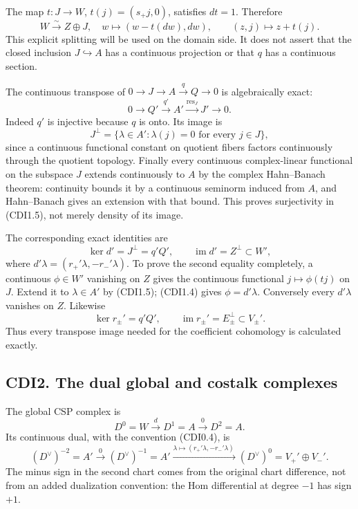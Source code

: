 The map \(t:J\to W\), \(t(j)=(s_+j,0)\), satisfies \(dt=1\). Therefore
\[
W\xrightarrow{\sim}Z\oplus J,
\quad w\longmapsto(w-t(dw),dw),
\qquad (z,j)\longmapsto z+t(j).
\tag{CDI1.4}
\] This explicit splitting will be used on the domain side. It does not
assert that the closed inclusion \(J\hookrightarrow A\) has a continuous
projection or that \(q\) has a continuous section.

The continuous transpose of \(0\to J\to A\xrightarrow q Q\to0\) is
algebraically exact: \[
0\longrightarrow Q'\xrightarrow{q'}A'
\xrightarrow{\operatorname{res}_J}J'\longrightarrow0.
\tag{CDI1.5}
\] Indeed \(q'\) is injective because \(q\) is onto. Its image is \[
J^\perp=\{\lambda\in A':\lambda(j)=0\text{ for every }j\in J\},
\tag{CDI1.6}
\] since a continuous functional constant on quotient fibers factors
continuously through the quotient topology. Finally every continuous
complex-linear functional on the subspace \(J\) extends continuously to
\(A\) by the complex Hahn--Banach theorem: continuity bounds it by a
continuous seminorm induced from \(A\), and Hahn--Banach gives an
extension with that bound. This proves surjectivity in (CDI1.5), not
merely density of its image.

The corresponding exact identities are \[
\ker d'=J^\perp=q'Q',\qquad
\operatorname{im}d'=Z^\perp\subset W',
\tag{CDI1.7}
\] where \(d'\lambda=(r_+'\lambda,-r_-'\lambda)\). To prove the second
equality completely, a continuous \(\phi\in W'\) vanishing on \(Z\)
gives the continuous functional \(j\mapsto\phi(tj)\) on \(J\). Extend it
to \(\lambda\in A'\) by (CDI1.5); (CDI1.4) gives \(\phi=d'\lambda\).
Conversely every \(d'\lambda\) vanishes on \(Z\). Likewise \[
\ker r_\pm'=q'Q',\qquad
\operatorname{im}r_\pm'=E_\pm^\perp\subset V_\pm'.
\tag{CDI1.8}
\] Thus every transpose image needed for the coefficient cohomology is
calculated exactly.

\subsection{CDI2. The dual global and costalk
complexes}\label{cdi2.-the-dual-global-and-costalk-complexes}

The global CSP complex is \[
D^0=W\xrightarrow{\ d\ }D^1=A\xrightarrow{\ 0\ }D^2=A.
\tag{CDI2.1}
\] Its continuous dual, with the convention (CDI0.4), is \[
(D^\vee)^{-2}=A'
\xrightarrow{\ 0\ }(D^\vee)^{-1}=A'
\xrightarrow{\lambda\mapsto(r_+'\lambda,-r_-'\lambda)\ }
(D^\vee)^0=V_+'\oplus V_-'.
\tag{CDI2.2}
\] The minus sign in the second chart comes from the original chart
difference, not from an added dualization convention: the Hom
differential at degree \(-1\) has sign \(+1\).

